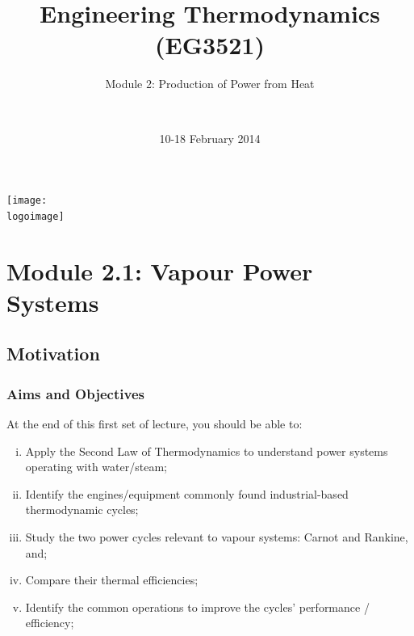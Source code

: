 \documentclass[10pt,compress]{beamer}
\institute{School of Engineering}
\title{Engineering Thermodynamics (EG3521)}
\subtitle{Module 2: Production of Power from Heat}
\date[10-18/02/2014]{10-18 February 2014}
\author[\shortname]{%
  \fullname\\\ttfamily{\emailaddress}
}
\newcommand{\logoimage}{../FigBanner/UoAHorizBanner}
\begin{document}
\begin{frame}
  \titlepage
  \vfill%
  \begin{center}
    \texttt{[image: \\logoimage]}
  \end{center}
\end{frame}




\section{Module 2.1: Vapour Power Systems}

\subsection{Motivation}
\begin{frame}
 \frametitle{Aims and Objectives}
 At the end of this first set of lecture, you should be able to:
 \begin{enumerate}[(i)]
  \item <2-> Apply the Second Law of Thermodynamics to understand power systems operating with water/steam;
  \item <3-> Identify the engines/equipment commonly found industrial-based thermodynamic cycles; 
  \item <4-> Study the two power cycles relevant to vapour systems: Carnot and Rankine, and; 
  \item <5-> Compare their thermal efficiencies;
  \item <6-> Identify the common operations to improve the cycles' performance / efficiency;
 \end{enumerate}
\end{frame}
 
\end{document}
